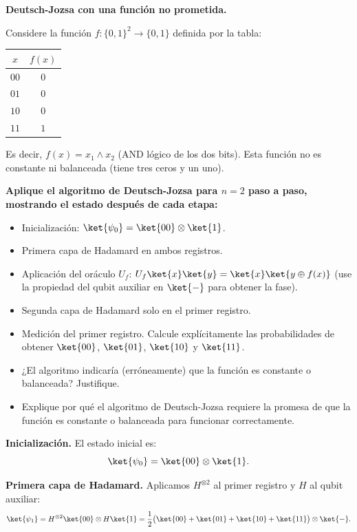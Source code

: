{\bfseries Deutsch-Jozsa con una función no prometida.

Considere la función $f:\{0,1\}^2 \to \{0,1\}$ definida por la tabla:

\begin{center}
    \begin{tabular}{c|c}
        $x$  & $f(x)$ \\ \hline
        $00$ & $0$    \\
        $01$ & $0$    \\
        $10$ & $0$    \\
        $11$ & $1$
    \end{tabular}
\end{center}

Es decir, $f(x) = x_1 \wedge x_2$ (AND lógico de los dos bits). Esta función no es constante ni balanceada (tiene tres ceros y un uno).}

{\bfseries Aplique el algoritmo de Deutsch-Jozsa para $n=2$ paso a paso, mostrando el estado después de cada etapa:
\begin{itemize}
    \item Inicialización: $\ket{\psi_0} = \ket{00} \otimes \ket{1}$.
    \item Primera capa de Hadamard en ambos registros.
    \item Aplicación del oráculo $U_f$: $U_f\ket{x}\ket{y} = \ket{x}\ket{y \oplus f(x)}$ (use la propiedad del qubit auxiliar en $\ket{-}$ para obtener la fase).
    \item Segunda capa de Hadamard solo en el primer registro.
    \item Medición del primer registro. Calcule explícitamente las probabilidades de obtener $\ket{00}$, $\ket{01}$, $\ket{10}$ y $\ket{11}$.
    \item ¿El algoritmo indicaría (erróneamente) que la función es constante o balanceada? Justifique.
    \item Explique por qué el algoritmo de Deutsch-Jozsa requiere la promesa de que la función es constante o balanceada para funcionar correctamente.
\end{itemize}
}

\textbf{Inicialización.} El estado inicial es:
$$
    \ket{\psi_0} = \ket{00} \otimes \ket{1}.
$$

\textbf{Primera capa de Hadamard.} Aplicamos $H^{\otimes 2}$ al primer registro y $H$ al qubit auxiliar:
$$
    \ket{\psi_1} = H^{\otimes 2}\ket{00} \otimes H\ket{1} = \frac{1}{2}\big(\ket{00}+\ket{01}+\ket{10}+\ket{11}\big) \otimes \ket{-}.
$$

